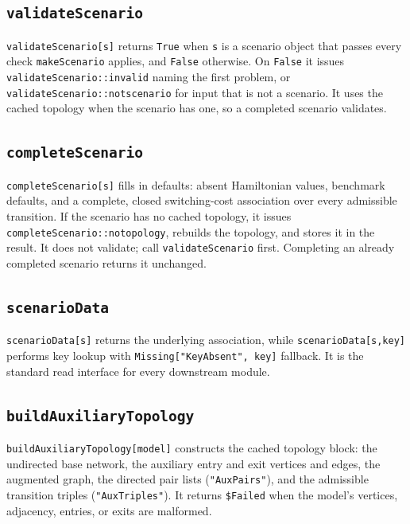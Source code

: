\documentclass[11pt]{article}
\begin{document}
\subsection*{\texttt{validateScenario}}

\texttt{validateScenario[s]} returns \texttt{True} when \texttt{s} is a scenario object that passes every check \texttt{makeScenario} applies, and \texttt{False} otherwise. On \texttt{False} it issues \texttt{validateScenario::invalid} naming the first problem, or \texttt{validateScenario::notscenario} for input that is not a scenario. It uses the cached topology when the scenario has one, so a completed scenario validates.

\subsection*{\texttt{completeScenario}}

\texttt{completeScenario[s]} fills in defaults: absent Hamiltonian values, benchmark defaults, and a complete, closed switching-cost association over every admissible transition. If the scenario has no cached topology, it issues \texttt{completeScenario::notopology}, rebuilds the topology, and stores it in the result. It does not validate; call \texttt{validateScenario} first. Completing an already completed scenario returns it unchanged.

\subsection*{\texttt{scenarioData}}

\texttt{scenarioData[s]} returns the underlying association, while \texttt{scenarioData[s,key]} performs key lookup with \texttt{Missing["KeyAbsent", key]} fallback. It is the standard read interface for every downstream module.

\subsection*{\texttt{buildAuxiliaryTopology}}

\texttt{buildAuxiliaryTopology[model]} constructs the cached topology block: the undirected base network, the auxiliary entry and exit vertices and edges, the augmented graph, the directed pair lists (\texttt{"AuxPairs"}), and the admissible transition triples (\texttt{"AuxTriples"}). It returns \texttt{\$Failed} when the model's vertices, adjacency, entries, or exits are malformed.
\end{document}
